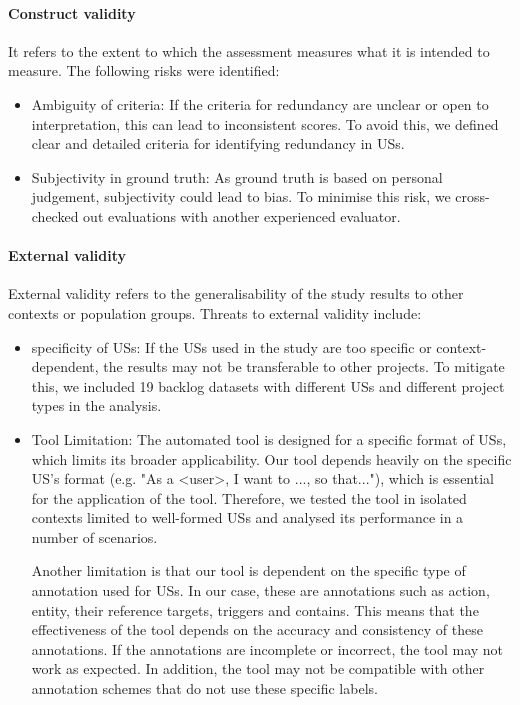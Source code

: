 \paragraph{Construct validity}It refers to the extent to which the assessment measures what it is intended to measure. The following risks were identified:
\begin{itemize}
	\item Ambiguity of criteria: If the criteria for redundancy are unclear or open to interpretation, this can lead to inconsistent scores. To avoid this, we defined clear and detailed criteria for identifying redundancy in USs.
	
	\item Subjectivity in ground truth: As ground truth is based on personal judgement, subjectivity could lead to bias. To minimise this risk, we cross-checked out evaluations with another experienced evaluator.
\end{itemize}
\paragraph{External validity}External validity refers to the generalisability of the study results to other contexts or population groups. Threats to external validity include:

\begin{itemize}
	\item specificity of USs: If the USs used in the study are too specific or context-dependent, the results may not be transferable to other projects. To mitigate this, we included 19 backlog datasets with different USs and different project types in the analysis.
	
	\item Tool Limitation: The automated tool is designed for a specific format of USs, which limits its broader applicability. Our tool depends heavily on the specific US's format (e.g. "As a \textless user\textgreater, I want to ..., so that..."), which is essential for the application of the tool. Therefore, we tested the tool in isolated contexts limited to well-formed USs and analysed its performance in a number of scenarios.
	
	Another limitation is that our tool is dependent on the specific type of annotation used for USs. In our case, these are annotations such as action, entity, their reference targets, triggers and contains. This means that the effectiveness of the tool depends on the accuracy and consistency of these annotations. If the annotations are incomplete or incorrect, the tool may not work as expected. In addition, the tool may not be compatible with other annotation schemes that do not use these specific labels.
\end{itemize}
